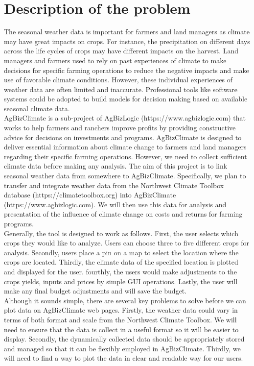 \documentclass[letterpaper,10pt]{article}
\begin{document}
    \section*{Description of the problem}
    The seasonal weather data is important for farmers and land managers as climate may have great impacts on crops. For instance, the precipitation on different days across the life cycles of crops may have different impacts on the harvest. Land managers and farmers used to rely on past experiences of climate to make decisions for specific farming operations to reduce the negative impacts and make use of favorable climate conditions. However, these individual experiences of weather data are often limited and inaccurate. Professional tools like software systems could be adopted to build models for decision making based on available seasonal climate data.\\
    
    AgBizClimate is a sub-project of AgBizLogic (https://www.agbizlogic.com) that works to help farmers and ranchers improve profits by providing constructive advice for decisions on investments and programs. AgBizClimate is designed to deliver essential information about climate change to farmers and land managers regarding their specific farming operations. However, we need to collect sufficient climate data before making any analysis. The aim of this project is to link seasonal weather data from somewhere to AgBizClimate. Specifically, we plan to transfer and integrate weather data from the Northwest Climate Toolbox database (https://climatetoolbox.org) into AgBizClimate (https://www.agbizlogic.com). We will then use this data for analysis and presentation of the influence of climate change on costs and returns for farming programs.\\
    
    Generally, the tool is designed to work as follows. First, the user selects which crops they would like to analyze. Users can choose three to five different crops for analysis. Secondly, users place a pin on a map to select the location where the crops are located. Thirdly, the climate data of the specified location is plotted and displayed for the user. fourthly, the users would make adjustments to the crops yields, inputs and prices by simple GUI operations. Lastly, the user will make any final budget adjustments and will save the budget.\\
    
    Although it sounds simple, there are several key problems to solve before we can plot data on AgBizClimate web pages. Firstly, the weather data could vary in terms of both format and scale from the Northwest Climate Toolbox. We will need to ensure that the data is collect in a useful format so it will be easier to display. Secondly, the dynamically collected data should be appropriately stored and managed so that it can be flexibly employed in AgBizClimate. Thirdly, we will need to find a way to plot the data in clear and readable way for our users.
\end{document}
